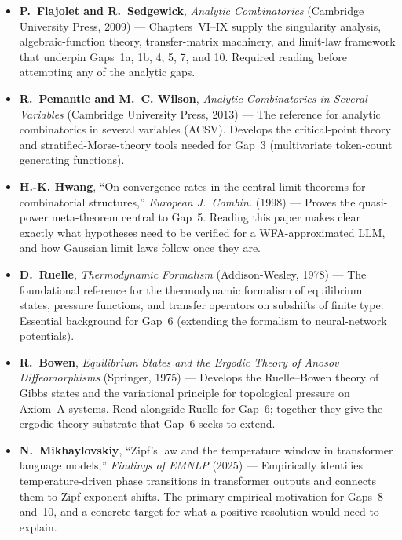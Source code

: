 \begin{itemize}
  \item \textbf{P.~Flajolet and R.~Sedgewick}, \emph{Analytic Combinatorics} (Cambridge University Press, 2009) \cite{FlajoletSedgewick2009} --- Chapters~VI--IX supply the singularity analysis, algebraic-function theory, transfer-matrix machinery, and limit-law framework that underpin Gaps~1a, 1b, 4, 5, 7, and 10. Required reading before attempting any of the analytic gaps.

  \item \textbf{R.~Pemantle and M.~C. Wilson}, \emph{Analytic Combinatorics in Several Variables} (Cambridge University Press, 2013) \cite{PemantleWilson2013} --- The reference for analytic combinatorics in several variables (ACSV). Develops the critical-point theory and stratified-Morse-theory tools needed for Gap~3 (multivariate token-count generating functions).

  \item \textbf{H.-K. Hwang}, ``On convergence rates in the central limit theorems for combinatorial structures,'' \emph{European J.\ Combin.} (1998) \cite{Hwang1998} --- Proves the quasi-power meta-theorem central to Gap~5. Reading this paper makes clear exactly what hypotheses need to be verified for a WFA-approximated LLM, and how Gaussian limit laws follow once they are.

  \item \textbf{D.~Ruelle}, \emph{Thermodynamic Formalism} (Addison-Wesley, 1978) \cite{Ruelle1978} --- The foundational reference for the thermodynamic formalism of equilibrium states, pressure functions, and transfer operators on subshifts of finite type. Essential background for Gap~6 (extending the formalism to neural-network potentials).

  \item \textbf{R.~Bowen}, \emph{Equilibrium States and the Ergodic Theory of Anosov Diffeomorphisms} (Springer, 1975) \cite{Bowen1975} --- Develops the Ruelle--Bowen theory of Gibbs states and the variational principle for topological pressure on Axiom~A systems. Read alongside Ruelle for Gap~6; together they give the ergodic-theory substrate that Gap~6 seeks to extend.

  \item \textbf{N.~Mikhaylovskiy}, ``Zipf's law and the temperature window in transformer language models,'' \emph{Findings of EMNLP} (2025) \cite{Mikhaylovskiy2025b} --- Empirically identifies temperature-driven phase transitions in transformer outputs and connects them to Zipf-exponent shifts. The primary empirical motivation for Gaps~8 and~10, and a concrete target for what a positive resolution would need to explain.
\end{itemize}
